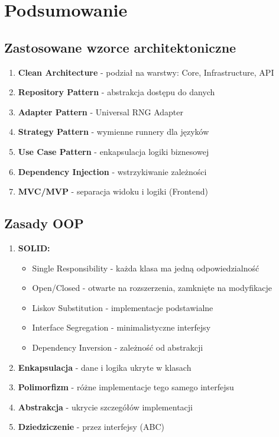 \documentclass[12pt,a4paper]{article}
\begin{document}
\section{Podsumowanie}

\subsection{Zastosowane wzorce architektoniczne}

\begin{enumerate}
    \item \textbf{Clean Architecture} - podział na warstwy: Core, Infrastructure, API
    \item \textbf{Repository Pattern} - abstrakcja dostępu do danych
    \item \textbf{Adapter Pattern} - Universal RNG Adapter
    \item \textbf{Strategy Pattern} - wymienne runnery dla języków
    \item \textbf{Use Case Pattern} - enkapsulacja logiki biznesowej
    \item \textbf{Dependency Injection} - wstrzykiwanie zależności
    \item \textbf{MVC/MVP} - separacja widoku i logiki (Frontend)
\end{enumerate}

\subsection{Zasady OOP}

\begin{enumerate}
    \item \textbf{SOLID:}
    \begin{itemize}
        \item Single Responsibility - każda klasa ma jedną odpowiedzialność
        \item Open/Closed - otwarte na rozszerzenia, zamknięte na modyfikacje
        \item Liskov Substitution - implementacje podstawialne
        \item Interface Segregation - minimalistyczne interfejsy
        \item Dependency Inversion - zależność od abstrakcji
    \end{itemize}
    
    \item \textbf{Enkapsulacja} - dane i logika ukryte w klasach
    \item \textbf{Polimorfizm} - różne implementacje tego samego interfejsu
    \item \textbf{Abstrakcja} - ukrycie szczegółów implementacji
    \item \textbf{Dziedziczenie} - przez interfejsy (ABC)
\end{enumerate}
\end{document}
